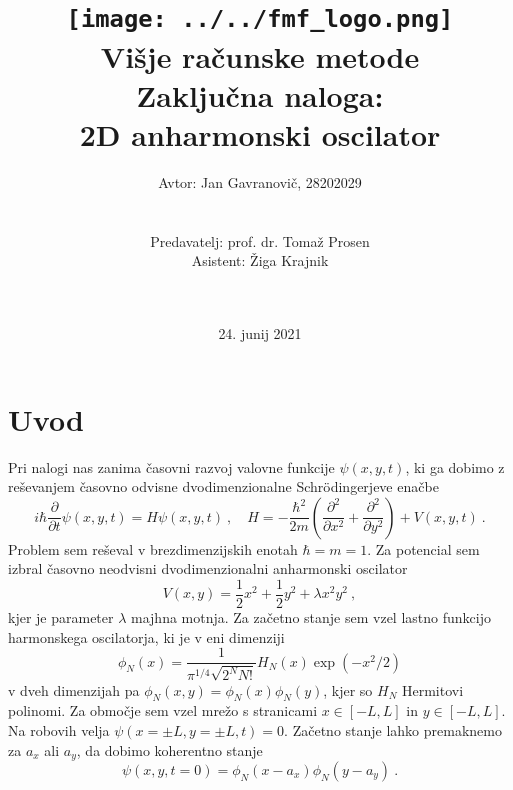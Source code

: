 \documentclass[11pt]{report}
\title{
	{\texttt{[image: ../../fmf\_logo.png]}}\\
	\vspace{1cm}
	{Višje računske metode}\\
	\vspace{0.5cm}
	{\Large Zaključna naloga: \LARGE \\ \textbf{2D anharmonski oscilator}}\\
}
\author{
	Avtor:  Jan Gavranovič, 28202029 \\ \\ \\  
	Predavatelj: prof. dr. Tomaž Prosen  \\
	Asistent: Žiga Krajnik \\ \\ \\
}
\date{24. junij 2021}
\newcommand{\p}{\partial}
\begin{document}
\maketitle

\section{Uvod}
Pri nalogi nas zanima časovni razvoj valovne funkcije $\psi(x, y, t)$, ki ga dobimo z reševanjem časovno
odvisne dvodimenzionalne Schr\" odingerjeve enačbe
\begin{equation}
	i \hbar \frac{\p}{\p t} \psi(x, y, t) = H \psi(x, y, t) \>,
	\quad H = -\frac{\hbar^2}{2m} \left (\frac{\p^2}{\p x^2} + \frac{\p^2}{\p y^2} \right ) + V(x, y, t) \>.
\end{equation}
Problem sem reševal v brezdimenzijskih enotah $\hbar = m = 1$. Za potencial sem izbral
časovno neodvisni dvodimenzionalni anharmonski oscilator
\begin{equation}
	V(x, y) = \frac{1}{2} x^2 + \frac{1}{2} y^2 + \lambda x^2 y^2 \>,
\end{equation}
kjer je parameter $\lambda$ majhna motnja. Za začetno stanje sem vzel lastno funkcijo
harmonskega oscilatorja, ki je v eni dimenziji
\begin{equation}
	\label{eq: phi}
	\phi_{N}(x)=\frac{1}{\pi^{1 / 4} \sqrt{2^{N} N !}} H_{N}(x) \exp \left (-x^{2} / 2\right )
\end{equation}
v dveh dimenzijah pa $\phi_N(x, y) = \phi_N(x) \phi_N(y)$, kjer so $H_N$ Hermitovi polinomi.
Za območje sem vzel mrežo s stranicami $x \in [-L, L]$ in $y \in [-L, L]$.
Na robovih velja $\psi(x=\pm L, y=\pm L, t)=0$. Začetno stanje lahko premaknemo za $a_x$ ali $a_y$,
da dobimo koherentno stanje
\begin{equation}
	\psi(x, y, t=0)=\phi_N(x-a_x)\phi_N(y-a_y) \>.
\end{equation}
\end{document}
